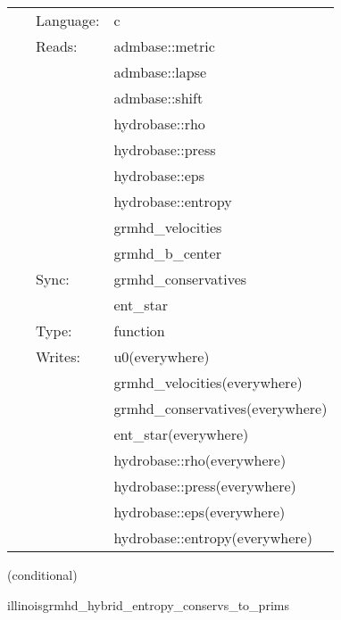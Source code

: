 \documentclass{article}
\begin{document}
 \begin{tabular*}{160mm}{cll} 
~ & Language:  & c \\ 
~ & Reads:  & admbase::metric \\ 
~& ~ &admbase::lapse\\ 
~& ~ &admbase::shift\\ 
~& ~ &hydrobase::rho\\ 
~& ~ &hydrobase::press\\ 
~& ~ &hydrobase::eps\\ 
~& ~ &hydrobase::entropy\\ 
~& ~ &grmhd\_velocities\\ 
~& ~ &grmhd\_b\_center\\ 
~ & Sync:  & grmhd\_conservatives \\ 
~& ~ &ent\_star\\ 
~ & Type:  & function \\ 
~ & Writes:  & u0(everywhere) \\ 
~& ~ &grmhd\_velocities(everywhere)\\ 
~& ~ &grmhd\_conservatives(everywhere)\\ 
~& ~ &ent\_star(everywhere)\\ 
~& ~ &hydrobase::rho(everywhere)\\ 
~& ~ &hydrobase::press(everywhere)\\ 
~& ~ &hydrobase::eps(everywhere)\\ 
~& ~ &hydrobase::entropy(everywhere)\\ 
\end{tabular*} 


\vspace{5mm}

   (conditional) 

\hspace{5mm} illinoisgrmhd\_hybrid\_entropy\_conservs\_to\_prims 

\hspace{5mm}{\it entropy+hybrid version of illinoisgrmhd\_conservs\_to\_prims } 


\hspace{5mm}
\end{document}
